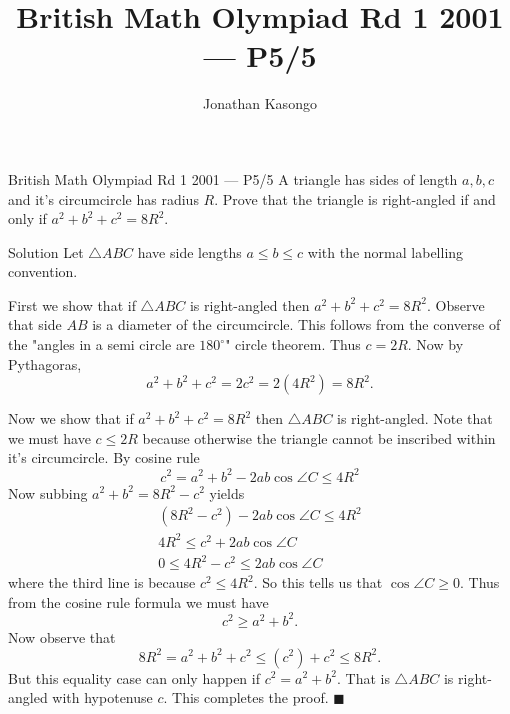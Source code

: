 \documentclass{article}
\author{Jonathan Kasongo}
\title{British Math Olympiad Rd 1 2001 --- P5/5}
\begin{document}
\maketitle

\begin{problem}{British Math Olympiad Rd 1 2001 --- P5/5}
A triangle has sides of length $a,b,c$ and it's circumcircle has radius
$R$. Prove that the triangle is right-angled if and only if
$a^2 + b^2 + c^2 = 8R^2$.
\end{problem}

\begin{solution}{Solution}
Let $\triangle ABC$ have side lengths $a \leq b \leq c$ with the normal
labelling convention. \vspace{0.2cm}

First we show that if $\triangle ABC$ is right-angled then
$a^2 + b^2 + c^2 = 8R^2$. Observe that side $AB$ is a diameter of the
circumcircle. This follows from the converse of the "angles in a semi circle
are $180^\circ$" circle theorem. Thus $c = 2R$. Now by Pythagoras,
$$
a^2 + b^2 + c^2 = 2c^2 = 2 (4R^2) = 8R^2.
$$
\vspace{0.2cm}

Now we show that if $a^2 + b^2 + c^2 = 8R^2$ then $\triangle ABC$ is
right-angled. Note that we must have $c \leq 2R$ because otherwise the
triangle cannot be inscribed within it's circumcircle. By cosine rule
$$
c^2 = a^2 + b^2 - 2ab\cos \angle C \leq 4R^2
$$
Now subbing $a^2 + b^2 = 8R^2 - c^2$ yields
\[
\begin{aligned}
(8R^2 - c^2) - 2ab \cos \angle C \leq 4R^2 \\
4R^2 \leq c^2 + 2ab \cos \angle C \\
0 \leq 4R^2 - c^2 \leq 2ab\cos\angle C
\end{aligned}
\]
where the third line is because $c^2 \leq 4R^2$. So this tells us that
$\cos \angle C \geq 0$. Thus from the cosine rule formula we must have
$$
c^2 \geq a^2 + b^2.
$$
Now observe that
$$
8R^2 = a^2 + b^2 + c^2 \leq (c^2) + c^2 \leq 8R^2.
$$
But this equality case can only happen if $c^2 = a^2 + b^2$. That is
$\triangle ABC$ is right-angled with hypotenuse $c$. This completes the
proof. $\blacksquare$
\end{solution}
\end{document}
